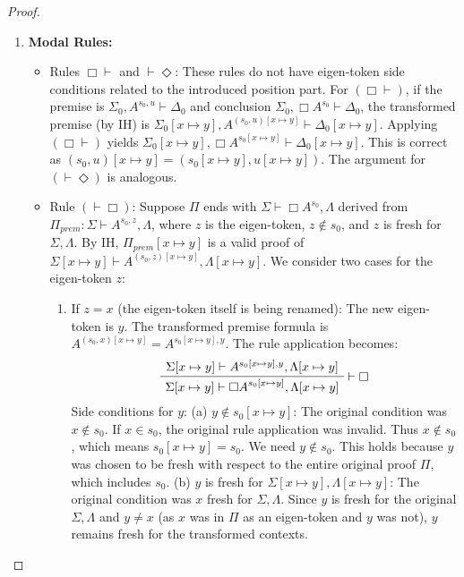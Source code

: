 \documentclass{article}
\newcommand{\seq}[2]{{#1} \vdash{} {#2}}
\newcommand{\pf}[2]{{#1}^{#2}} %
\theoremstyle{definition}
\begin{document}
{\begin{proof}
\begin{description}
\begin{enumerate}
        \item \textbf{Modal Rules:}
        \begin{itemize}
            \item Rules $\Box \vdash$ and $\vdash \Diamond$:
            These rules do not have eigen-token side conditions related to the introduced position part.
            For $(\Box \vdash)$, if the premise is $\seq{\Sigma_0, \pf{A}{s_0,u}}{\Delta_0}$ and conclusion $\seq{\Sigma_0, \pf{\Box A}{s_0}}{\Delta_0}$, the transformed premise (by IH) is $\seq{\Sigma_0[x \mapsto y], \pf{A}{(s_0,u)[x \mapsto y]}}{\Delta_0[x \mapsto y]}$. Applying $(\Box \vdash)$ yields $\seq{\Sigma_0[x \mapsto y], \pf{\Box A}{s_0[x \mapsto y]}}{\Delta_0[x \mapsto y]}$. This is correct as $(s_0,u)[x \mapsto y] = (s_0[x \mapsto y], u[x \mapsto y])$. The argument for $(\vdash \Diamond)$ is analogous.

            \item Rule $(\vdash \Box)$: Suppose $\Pi$ ends with $\seq{\Sigma}{\pf{\Box A}{s_0}, \Lambda}$ derived from $\Pi_{prem}: \seq{\Sigma}{\pf{A}{s_0,z}, \Lambda}$, where $z$ is the eigen-token, $z \notin s_0$, and $z$ is fresh for $\Sigma, \Lambda$.
            By IH, $\Pi_{prem}[x \mapsto y]$ is a valid proof of $\seq{\Sigma[x \mapsto y]}{\pf{A}{(s_0,z)[x \mapsto y]}, \Lambda[x \mapsto y]}$.
            We consider two cases for the eigen-token $z$:
            \begin{enumerate}
                \item If $z = x$ (the eigen-token itself is being renamed): The new eigen-token is $y$. The transformed premise formula is $\pf{A}{(s_0,x)[x \mapsto y]} = \pf{A}{s_0[x \mapsto y],y}$. The rule application becomes:
                \[
                \AxiomC{$\seq{\Sigma[x \mapsto y]}{\pf{A}{s_0[x \mapsto y],y}, \Lambda[x \mapsto y]}$}
                \RightLabel{$\vdash \Box$}
                \UnaryInfC{$\seq{\Sigma[x \mapsto y]}{\pf{\Box A}{s_0[x \mapsto y]}, \Lambda[x \mapsto y]}$}
                \DisplayProof
                \]
                Side conditions for $y$:
                (a) $y \notin s_0[x \mapsto y]$: The original condition was $x \notin s_0$. If $x \in s_0$, the original rule application was invalid. Thus $x \notin s_0$, which means $s_0[x \mapsto y] = s_0$. We need $y \notin s_0$. This holds because $y$ was chosen to be fresh with respect to the entire original proof $\Pi$, which includes $s_0$.
                (b) $y$ is fresh for $\Sigma[x \mapsto y], \Lambda[x \mapsto y]$:
                The original condition was $x$ fresh for $\Sigma, \Lambda$.
                Since $y$ is fresh for the original $\Sigma, \Lambda$ and $y \neq x$
                (as $x$ was in $\Pi$ as an eigen-token and $y$ was not),
                $y$ remains fresh for the transformed contexts.


\end{enumerate}
\end{itemize}
\end{enumerate}
\end{description}
\end{proof}}
\end{document}

